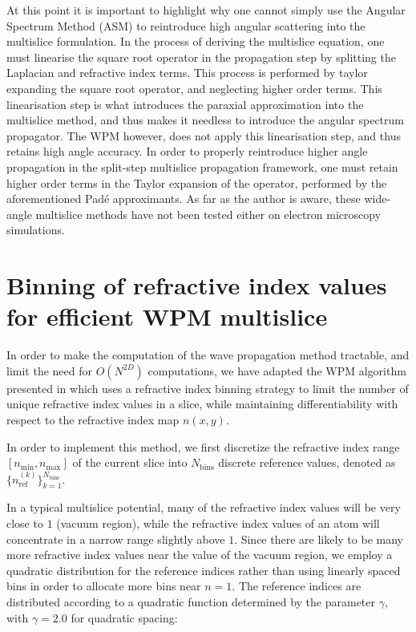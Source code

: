 \documentclass{article}
\begin{document}
At this point it is important to highlight why one cannot simply use the Angular Spectrum Method (ASM) to reintroduce high angular scattering into the multislice formulation. In the process of deriving the multislice equation, 
one must linearise the square root operator in the propagation step by splitting the Laplacian and refractive index terms. This process is performed by taylor expanding the square root operator, and neglecting higher order terms.
This linearisation step is what introduces the paraxial approximation into the multislice method, and thus makes it needless to introduce the angular spectrum propagator.
The WPM however, does not apply this linearisation step, and thus retains high angle accuracy. In order to properly reintroduce higher angle propagation in the split-step multislice propagation framework, 
one must retain higher order terms in the Taylor expansion of the operator, performed by the aforementioned Padé approximants. As 
far as the author is aware, these wide-angle multislice methods have not been tested either on electron microscopy simulations.

\section{Binning of refractive index values for efficient WPM multislice}

In order to make the computation of the wave propagation method tractable, and limit the need for $O(N^{2D})$ computations, we have adapted the WPM algorithm presented in \cite{2025_paper} which 
uses a refractive index binning strategy to limit the number of unique refractive index values in a slice, while maintaining differentiability with respect to the refractive index map $n(x,y)$.

In order to implement this method, we first discretize the refractive index range $[n_{\mathrm{min}}, n_{\mathrm{max}}]$ of the current slice into $N_{\mathrm{bins}}$ discrete reference values, denoted as 
$\{n_{\mathrm{ref}}^{(k)}\}_{k=1}^{N_{\mathrm{bins}}}$.

In a typical multislice potential, many of the refractive index values will be very close to $1$ (vacuum region), while the refractive index values of an atom 
will concentrate in a narrow range slightly above $1$. Since there are likely to be many more refractive index values near the value of the vacuum region, 
we employ a quadratic distribution for the reference indices rather than using linearly spaced bins in order to allocate more bins near $n=1$.
The reference indices are distributed according to a quadratic function determined by the parameter $\gamma$, with $\gamma=2.0$ for quadratic spacing: 
\end{document}
